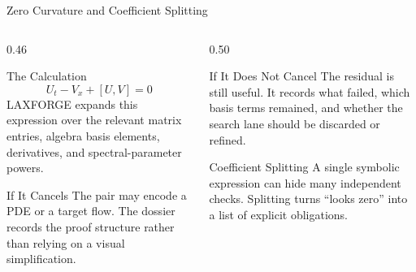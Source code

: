 \documentclass[aspectratio=169,11pt]{beamer}
\newcommand{\ZCR}{\ensuremath{U_t - V_x + [U,V] = 0}}
\begin{document}
\begin{frame}{Zero Curvature and Coefficient Splitting}
  \begin{columns}[T,totalwidth=\textwidth]
    \begin{column}{0.46\textwidth}
      \begin{block}{The Calculation}
        \[
          \ZCR
        \]
        LAXFORGE expands this expression over the relevant matrix entries,
        algebra basis elements, derivatives, and spectral-parameter powers.
      \end{block}
      \begin{block}{If It Cancels}
        The pair may encode a PDE or a target flow. The dossier records the
        proof structure rather than relying on a visual simplification.
      \end{block}
    \end{column}
    \begin{column}{0.50\textwidth}
      \begin{alertblock}{If It Does Not Cancel}
        The residual is still useful. It records what failed, which basis terms
        remained, and whether the search lane should be discarded or refined.
      \end{alertblock}
      \begin{block}{Coefficient Splitting}
        A single symbolic expression can hide many independent checks.
        Splitting turns ``looks zero'' into a list of explicit obligations.
      \end{block}
    \end{column}
  \end{columns}
\end{frame}
\end{document}
